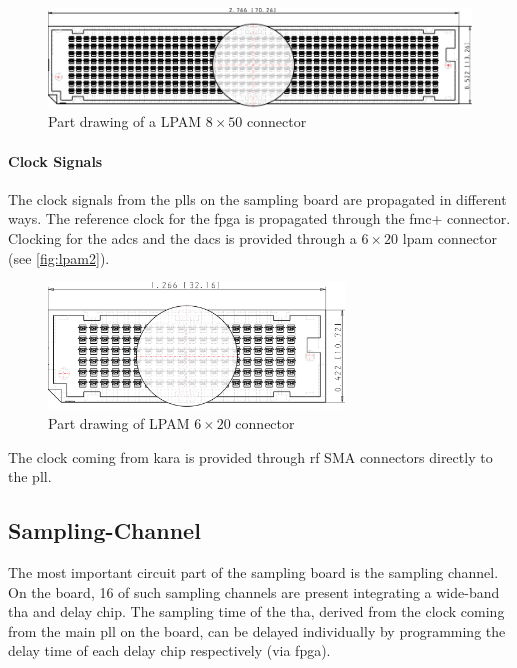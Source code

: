 \begin{figure}[tb]
	\centering
	\includegraphics[width = \textwidth]{chap/04-theresa/img/connectors/lpam_50_top.pdf}
	\caption[LPAM $8\times50$ connector]{Part drawing of a LPAM $8\times50$ connector}
	\label{fig:lpam1}
\end{figure}


\paragraph{Clock Signals}
The clock signals from the \glspl{pll} on the sampling board are propagated in different ways.
The reference clock for the \gls{fpga} is propagated through the \gls{fmc}+ connector.
Clocking for the \glspl{adc} and the \glspl{dac} is provided through a $6\times20$ \gls{lpam} connector (see \autoref{fig:lpam2}).
\begin{figure}[tb]
	\centering
	\includegraphics[width = 0.7\textwidth]{chap/04-theresa/img/connectors/lpam_20.pdf}
	\caption[LPAM $6\times20$ connector]{Part drawing of LPAM $6\times20$ connector}
	\label{fig:lpam2}
\end{figure}

The clock coming from \gls{kara} is provided through \gls{rf} SMA connectors directly to the \gls{pll}.

\subsection{Sampling-Channel}
The most important circuit part of the sampling board is the sampling channel. 
On the board, 16 of such sampling channels are present integrating a wide-band \gls{tha} and delay chip.
The sampling time of the \gls{tha}, derived from the clock coming from the main \gls{pll} on the board, can be delayed individually by programming the delay time of each delay chip respectively (via \gls{fpga}). 

